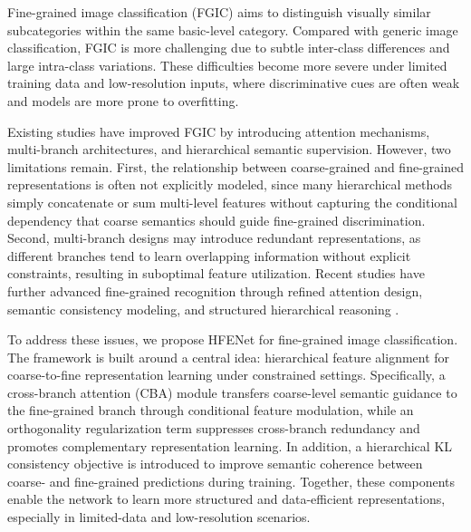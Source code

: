\documentclass[pdflatex,iicol,sn-mathphys-num]{sn-jnl}
\theoremstyle{thmstyleone}%
\theoremstyle{thmstyletwo}%
\theoremstyle{thmstylethree}%
\begin{document}
Fine-grained image classification (FGIC) aims to distinguish visually similar subcategories within the same basic-level category. Compared with generic image classification, FGIC is more challenging due to subtle inter-class differences and large intra-class variations. These difficulties become more severe under limited training data and low-resolution inputs, where discriminative cues are often weak and models are more prone to overfitting.

Existing studies have improved FGIC by introducing attention mechanisms, multi-branch architectures, and hierarchical semantic supervision. However, two limitations remain. First, the relationship between coarse-grained and fine-grained representations is often not explicitly modeled, since many hierarchical methods simply concatenate or sum multi-level features without capturing the conditional dependency that coarse semantics should guide fine-grained discrimination. Second, multi-branch designs may introduce redundant representations, as different branches tend to learn overlapping information without explicit constraints, resulting in suboptimal feature utilization. Recent studies have further advanced fine-grained recognition through refined attention design, semantic consistency modeling, and structured hierarchical reasoning \cite{wang2025crasmra,wang2025cfgvc,gao2025chbc}.

To address these issues, we propose HFENet for fine-grained image classification. The framework is built around a central idea: hierarchical feature alignment for coarse-to-fine representation learning under constrained settings. Specifically, a cross-branch attention (CBA) module transfers coarse-level semantic guidance to the fine-grained branch through conditional feature modulation, while an orthogonality regularization term suppresses cross-branch redundancy and promotes complementary representation learning. In addition, a hierarchical KL consistency objective is introduced to improve semantic coherence between coarse- and fine-grained predictions during training. Together, these components enable the network to learn more structured and data-efficient representations, especially in limited-data and low-resolution scenarios.
\end{document}
